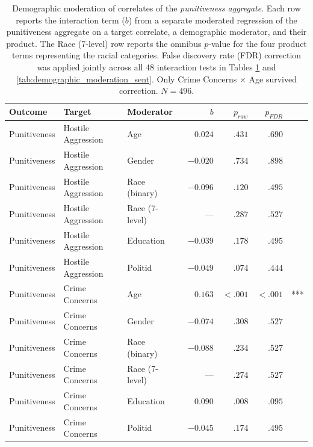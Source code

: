 \begin{table}[!htbp]
  \centering
  \caption{Demographic moderation of correlates of the \textit{punitiveness aggregate}. Each row reports the interaction term ($b$) from a separate moderated regression of the punitiveness aggregate on a target correlate, a demographic moderator, and their product. The Race (7-level) row reports the omnibus $p$-value for the four product terms representing the racial categories. False discovery rate (FDR) correction was applied jointly across all 48 interaction tests in Tables \ref{tab:demographic_moderation_punit} and \ref{tab:demographic_moderation_sent}. Only Crime Concerns $\times$ Age survived correction. $N = 496$.}
  \label{tab:demographic_moderation_punit}
  \small
  \begin{tabular}{lllrrrl}
    \toprule
    Outcome & Target & Moderator & $b$ & $p_\textit{raw}$ & $p_\textit{FDR}$ & \\
    \midrule
    Punitiveness & Hostile Aggression & Age            & $\phantom{-}0.024$ & $.431$  & $.690$  & \\
    Punitiveness & Hostile Aggression & Gender         & $-0.020$           & $.734$  & $.898$  & \\
    Punitiveness & Hostile Aggression & Race (binary)  & $-0.096$           & $.120$  & $.495$  & \\
    Punitiveness & Hostile Aggression & Race (7-level) & ---                & $.287$  & $.527$  & \\
    Punitiveness & Hostile Aggression & Education      & $-0.039$           & $.178$  & $.495$  & \\
    Punitiveness & Hostile Aggression & Politid        & $-0.049$           & $.074$  & $.444$  & \\
    \addlinespace
    Punitiveness & Crime Concerns     & Age            & $\phantom{-}0.163$ & $<.001$ & $<.001$ & *** \\
    Punitiveness & Crime Concerns     & Gender         & $-0.074$           & $.308$  & $.527$  & \\
    Punitiveness & Crime Concerns     & Race (binary)  & $-0.088$           & $.234$  & $.527$  & \\
    Punitiveness & Crime Concerns     & Race (7-level) & ---                & $.274$  & $.527$  & \\
    Punitiveness & Crime Concerns     & Education      & $\phantom{-}0.090$ & $.008$  & $.095$  & \\
    Punitiveness & Crime Concerns     & Politid        & $-0.045$           & $.174$  & $.495$  & \\

\end{tabular}
\end{table}
